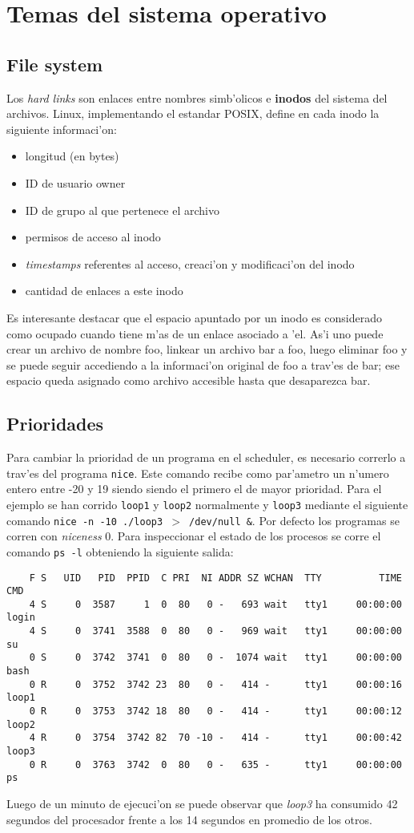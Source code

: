 \section{Temas del sistema operativo}
\subsection{File system}
Los \emph{hard links} son enlaces entre nombres simb'olicos e \textbf{inodos} del sistema del archivos. Linux, implementando el estandar POSIX, define en cada inodo la siguiente informaci'on:
\begin{itemize}
\item longitud (en bytes)
\item ID de usuario owner
\item ID de grupo al que pertenece el archivo
\item permisos de acceso al inodo
\item \emph{timestamps} referentes al acceso, creaci'on y modificaci'on del inodo
\item cantidad de enlaces a este inodo
\end{itemize}
Es interesante destacar que el espacio apuntado por un inodo es considerado como ocupado cuando tiene m'as de un enlace asociado a 'el. As'i uno puede crear un archivo de nombre foo, linkear un archivo bar a foo, luego eliminar foo y se puede seguir accediendo a la informaci'on original de foo a trav'es de bar; ese espacio queda asignado como archivo accesible hasta que desaparezca bar.
\subsection{Prioridades}
Para cambiar la prioridad de un programa en el scheduler, es necesario correrlo a trav'es del programa \texttt{nice}. Este comando recibe como par'ametro un n'umero entero entre -20 y 19 siendo siendo el primero el de mayor prioridad. Para el ejemplo se han corrido \texttt{loop1} y \texttt{loop2} normalmente y \texttt{loop3} mediante el siguiente comando \texttt{nice -n -10 ./loop3 $>$ /dev/null \&}. Por defecto los programas se corren con \emph{niceness} 0. Para inspeccionar el estado de los procesos se corre el comando \texttt{ps -l} obteniendo la siguiente salida:
\begin{mylisting}
\begin{verbatim}
    F S   UID   PID  PPID  C PRI  NI ADDR SZ WCHAN  TTY          TIME CMD
    4 S     0  3587     1  0  80   0 -   693 wait   tty1     00:00:00 login
    4 S     0  3741  3588  0  80   0 -   969 wait   tty1     00:00:00 su
    0 S     0  3742  3741  0  80   0 -  1074 wait   tty1     00:00:00 bash
    0 R     0  3752  3742 23  80   0 -   414 -      tty1     00:00:16 loop1
    0 R     0  3753  3742 18  80   0 -   414 -      tty1     00:00:12 loop2
    4 R     0  3754  3742 82  70 -10 -   414 -      tty1     00:00:42 loop3
    0 R     0  3763  3742  0  80   0 -   635 -      tty1     00:00:00 ps
\end{verbatim}
\end{mylisting}
Luego de un minuto de ejecuci'on se puede observar que \emph{loop3} ha consumido 42 segundos del procesador frente a los 14 segundos en promedio de los otros.

